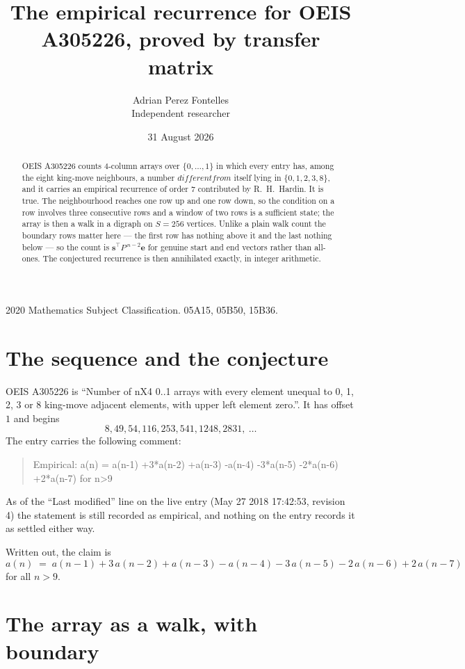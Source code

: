 \documentclass[11pt,a4paper]{article}
\title{The empirical recurrence for OEIS A305226, proved by transfer matrix}
\author{Adrian Perez Fontelles\\ \small Independent researcher}
\date{31 August 2026}
\theoremstyle{plain}
\theoremstyle{definition}
\begin{document}
\maketitle

\begin{abstract}
OEIS A305226 counts $4$-column arrays over $\{0,\dots,1\}$ in which every entry has,
among the eight king-move neighbours, a number $different from$ itself lying in $\{0,1,2,3,8\}$, and it carries an empirical
recurrence of order $7$ contributed by R.~H.~Hardin. It is true. The neighbourhood
reaches one row up and one row down, so the condition on a row involves three consecutive
rows and a window of two rows is a sufficient state; the array is then a walk in a digraph
on $S=256$ vertices. Unlike a plain walk count the boundary rows matter here --- the first
row has nothing above it and the last nothing below --- so the count is
$\mathbf{s}^{\!\top}P^{\,n-2}\mathbf{e}$ for genuine start and end vectors rather than
all-ones. The conjectured recurrence is then annihilated exactly, in integer arithmetic.
\end{abstract}

\noindent\small 2020 Mathematics Subject Classification. 05A15, 05B50, 15B36.\normalsize

\section{The sequence and the conjecture}

OEIS A305226 is ``Number of nX4 0..1 arrays with every element unequal to 0, 1, 2, 3 or 8 king-move adjacent elements, with upper left element zero.''. It has offset
$1$ and begins
\[
8, 49, 54, 116, 253, 541, 1248, 2831,\ \dots
\]
The entry carries the following comment:
\begin{quote}\small
Empirical: a(n) = a(n-1) +3*a(n-2) +a(n-3) -a(n-4) -3*a(n-5) -2*a(n-6) +2*a(n-7) for n>9
\end{quote}
As of the ``Last modified'' line on the live entry (May 27 2018 17:42:53, revision
4) the statement is still recorded as empirical, and nothing on the entry
records it as settled either way.

Written out, the claim is
\begin{equation}\label{eq:conj}
a(n)\;=\;a(n-1) + 3\,a(n-2) + a(n-3) - a(n-4) - 3\,a(n-5) - 2\,a(n-6) + 2\,a(n-7)
\end{equation}
for all $n>9$.

\section{The array as a walk, with boundary}
\end{document}
